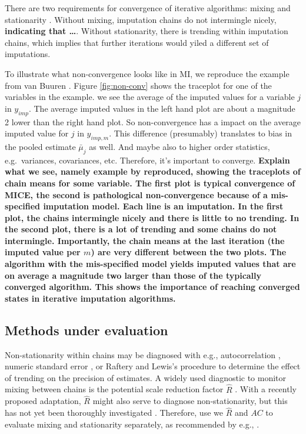 \documentclass[Royal,times,sageh]{sagej}
\begin{document}
There are two requirements for convergence of iterative algorithms:
mixing and stationarity \citep{gelm13}. Without mixing, imputation
chains do not intermingle nicely, \textbf{indicating that \ldots{}}.
Without stationarity, there is trending within imputation chains, which
implies that further iterations would yiled a different set of
imputations.

To illustrate what non-convergence looks like in MI, we reproduce the
example from van Buuren \citeyearpar[\(\S\) 6.5.2]{buur18}. Figure
\ref{fig:non-conv} shows the traceplot for one of the variables in the
example. we see the average of the imputed values for a variable \(j\)
in \(y_{imp}\). The average imputed values in the left hand plot are
about a magnitude 2 lower than the right hand plot. So non-convergence
has a impact on the average imputed value for \(j\) in \(y_{imp, m}\).
This difference (presumably) translates to bias in the pooled estimate
\(\bar{\mu}_j\) as well. And maybe also to higher order statistics,
e.g.~variances, covariances, etc. Therefore, it's important to converge.
\textbf{Explain what we see, namely example by \citet{buur18}
reproduced, showing the traceplots of chain means for some variable. The
first plot is typical convergence of MICE, the second is pathological
non-convergence because of a mis-specified imputation model. Each line
is an imputation. In the first plot, the chains intermingle nicely and
there is little to no trending. In the second plot, there is a lot of
trending and some chains do not intermingle. Importantly, the chain
means at the last iteration (the imputed value per \(m\)) are very
different between the two plots. The algorithm with the mis-specified
model yields imputed values that are on average a magnitude two larger
than those of the typically converged algorithm. This shows the
importance of reaching converged states in iterative imputation
algorithms.}

\hypertarget{methods-under-evaluation}{%
\subsection{Methods under evaluation}\label{methods-under-evaluation}}

Non-stationarity within chains may be diagnosed with e.g.,
autocorrelation \citep[\(AC\);][]{scha97, gelm13}, numeric standard
error \citep[`MC error';][]{gewe92}, or Raftery and Lewis's
\citeyearpar{raft91} procedure to determine the effect of trending on
the precision of estimates. A widely used diagnostic to monitor mixing
between chains is the potential scale reduction factor \(\widehat{R}\)
\citep[`Gelman-Rubin statistic';][]{gelm92}. With a recently proposed
adaptation, \(\widehat{R}\) might also serve to diagnose
non-stationarity, but this has not yet been thoroughly investigated
\citep{veht19}. Therefore, use we \(\widehat{R}\) and \(AC\) to evaluate
mixing and stationarity separately, as recommended by e.g.,
\citet{cowl96}.
\end{document}
